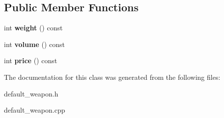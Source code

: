 \subsection*{Public Member Functions}
\begin{DoxyCompactItemize}
\item 
\hypertarget{classda__game_1_1DefaultWeapon_aa827b7dd05281ad20ff869666e493f5d}{
int {\bfseries weight} () const }
\label{classda__game_1_1DefaultWeapon_aa827b7dd05281ad20ff869666e493f5d}

\item 
\hypertarget{classda__game_1_1DefaultWeapon_a446988bb259fb96132fd7fb24da798f0}{
int {\bfseries volume} () const }
\label{classda__game_1_1DefaultWeapon_a446988bb259fb96132fd7fb24da798f0}

\item 
\hypertarget{classda__game_1_1DefaultWeapon_ac6c71d1c8cda696dc372a0e436dfcc98}{
int {\bfseries price} () const }
\label{classda__game_1_1DefaultWeapon_ac6c71d1c8cda696dc372a0e436dfcc98}

\end{DoxyCompactItemize}


The documentation for this class was generated from the following files:\begin{DoxyCompactItemize}
\item 
default\_\-weapon.h\item 
default\_\-weapon.cpp\end{DoxyCompactItemize}
